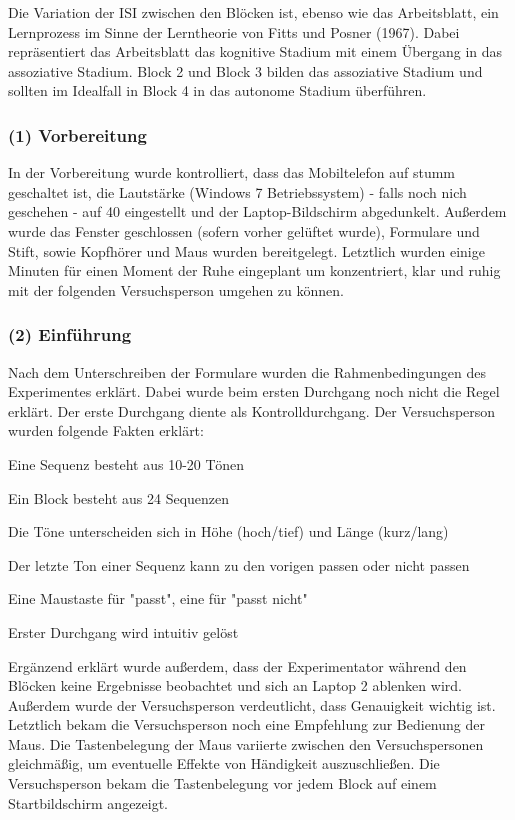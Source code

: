 \documentclass[doc,a4paper,12pt]{apa6}
\begin{document}
Die Variation der ISI zwischen den Blöcken ist, ebenso wie das Arbeitsblatt, ein Lernprozess im Sinne der Lerntheorie von Fitts und Posner (1967). Dabei repräsentiert das Arbeitsblatt das kognitive Stadium mit einem Übergang in das assoziative Stadium. Block 2 und Block 3 bilden das assoziative Stadium und sollten im Idealfall in Block 4 in das autonome Stadium überführen.

\subsubsection{(1) Vorbereitung}

In der Vorbereitung wurde kontrolliert, dass das Mobiltelefon auf stumm geschaltet ist, die Lautstärke (Windows 7 Betriebssystem) - falls noch nich geschehen - auf 40 eingestellt und der Laptop-Bildschirm abgedunkelt. Außerdem wurde das Fenster geschlossen (sofern vorher gelüftet wurde), Formulare und Stift, sowie Kopfhörer und Maus wurden bereitgelegt. Letztlich wurden einige Minuten für einen Moment der Ruhe eingeplant um konzentriert, klar und ruhig mit der folgenden Versuchsperson umgehen zu können.

\subsubsection{(2) Einführung}

Nach dem Unterschreiben der Formulare wurden die Rahmenbedingungen des Experimentes erklärt. Dabei wurde beim ersten Durchgang noch nicht die Regel erklärt. Der erste Durchgang diente als Kontrolldurchgang. Der Versuchsperson wurden folgende Fakten erklärt:

\begin{compactitem}
\item Eine Sequenz besteht aus 10-20 Tönen
\item Ein Block besteht aus 24 Sequenzen
\item Die Töne unterscheiden sich in Höhe (hoch/tief) und Länge (kurz/lang)
\item Der letzte Ton einer Sequenz kann zu den vorigen passen oder nicht passen
\item Eine Maustaste für "passt", eine für "passt nicht"
\item Erster Durchgang wird intuitiv gelöst
\end{compactitem}

Ergänzend erklärt wurde außerdem, dass der Experimentator während den Blöcken keine Ergebnisse beobachtet und sich an Laptop 2 ablenken wird. Außerdem wurde der Versuchsperson verdeutlicht, dass Genauigkeit wichtig ist. Letztlich bekam die Versuchsperson noch eine Empfehlung zur Bedienung der Maus. Die Tastenbelegung der Maus variierte zwischen den Versuchspersonen gleichmäßig, um eventuelle Effekte von Händigkeit auszuschließen. Die Versuchsperson bekam die Tastenbelegung vor jedem Block auf einem Startbildschirm angezeigt.
\end{document}
